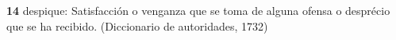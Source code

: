 \textbf{14} despique: Satisfacción o venganza que se toma de alguna ofensa o desprécio que se ha recibido. (Diccionario de autoridades, 1732)
